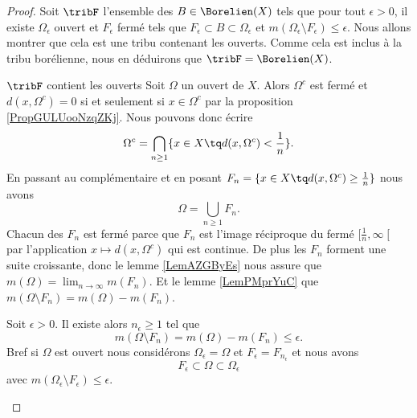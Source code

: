 \begin{proof}
    Soit \( \tribF\) l'ensemble des \( B\in\Borelien(X)\) tels que pour tout \( \epsilon>0\), il existe \( \Omega_{\epsilon}\) ouvert et \( F_{\epsilon}\) fermé tels que \( F_{\epsilon}\subset B\subset \Omega_{\epsilon}\) et \( m(\Omega_{\epsilon}\setminus F_{\epsilon})\leq \epsilon\). Nous allons montrer que cela est une tribu contenant les ouverts. Comme cela est inclus à la tribu borélienne, nous en déduirons que \( \tribF=\Borelien(X)\).
    \begin{subproof}
        \item[\( \tribF\) contient les ouverts]
            Soit \( \Omega\) un ouvert de \( X\). Alors \( \Omega^c\) est fermé et \( d(x,\Omega^c)=0\) si et seulement si \( x\in \Omega^c\) par la proposition \ref{PropGULUooNzqZKj}. Nous pouvons donc écrire
            \begin{equation}
                 \Omega^c=\bigcap_{n\geq 1}\{ x\in X\tq d(x,\Omega^c)<\frac{1}{ n } \}.
            \end{equation}
            En passant au complémentaire et en posant \( F_n=\{ x\in X\tq d(x,\Omega^c)\geq \frac{1}{ n } \}\) nous avons
            \begin{equation}
                \Omega=\bigcup_{n\geq 1}F_n.
            \end{equation}
            Chacun des \( F_n\) est fermé parce que \( F_n\) est l'image réciproque du fermé \( \mathopen[ \frac{1}{ n } , \infty \mathclose[\) par l'application \( x\mapsto d(x,\Omega^c)\) qui est continue. De plus les \( F_n\) forment une suite croissante, donc le lemme \ref{LemAZGByEs} nous assure que \( m(\Omega)=\lim_{n\to \infty}m(F_n)\). Et le lemme \ref{LemPMprYuC} que \( m(\Omega\setminus F_n)=m(\Omega)-m(F_n)\).
                
                Soit \( \epsilon>0\). Il existe alors \( n_{\epsilon}\geq 1\) tel que 
                \begin{equation}
                    m(\Omega\setminus F_n)=m(\Omega)-m(F_n)\leq \epsilon.
                \end{equation}
                Bref si \( \Omega\) est ouvert nous considérons \( \Omega_{\epsilon}=\Omega\) et \( F_{\epsilon}=F_{n_{\epsilon}}\) et nous avons
                \begin{equation}
                    F_{\epsilon}\subset \Omega\subset \Omega_{\epsilon}
                \end{equation}
                avec \( m(\Omega_{\epsilon}\setminus F_{\epsilon})\leq \epsilon\).


\end{subproof}
\end{proof}
